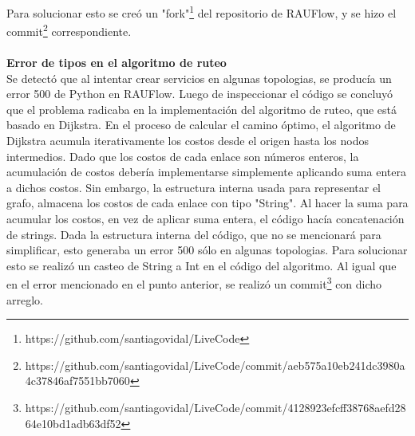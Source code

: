 Para solucionar esto se creó un "fork"\footnote{https://github.com/santiagovidal/LiveCode} del repositorio de RAUFlow, y se hizo el commit\footnote{https://github.com/santiagovidal/LiveCode/commit/aeb575a10eb241dc3980a4c37846af7551bb7060} correspondiente. \\ \\
\textbf{Error de tipos en el algoritmo de ruteo} \\
Se detectó que al intentar crear servicios en algunas topologias, se producía un error 500 de Python en RAUFlow. Luego de inspeccionar el código se concluyó que el problema radicaba en la implementación del algoritmo de ruteo, que está basado en Dijkstra. En el proceso de calcular el camino óptimo, el algoritmo de Dijkstra acumula iterativamente los costos desde el origen hasta los nodos intermedios. Dado que los costos de cada enlace son números enteros, la acumulación de costos debería implementarse simplemente aplicando suma entera a dichos costos. Sin embargo, la estructura interna usada para representar el grafo, almacena los costos de cada enlace con tipo "String". Al hacer la suma para acumular los costos, en vez de aplicar suma entera, el código hacía concatenación de strings. Dada la estructura interna del código, que no se mencionará para simplificar, esto generaba un error 500 sólo en algunas topologias. Para solucionar esto se realizó un casteo de String a Int en el código del algoritmo. Al igual que en el error mencionado en el punto anterior, se realizó un commit\footnote{https://github.com/santiagovidal/LiveCode/commit/4128923efcff38768aefd2864e10bd1adb63df52} con dicho arreglo.

